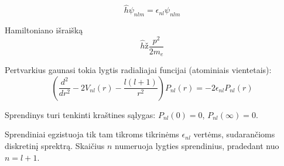 \begin{equation*}
    \hat{h} \psi_{nlm} = \epsilon_{nl} \psi_{nlm}
\end{equation*}

Hamiltoniano išraišką
\begin{equation*}
    \hat{h} ž \frac{p^2}{2m_e}
\end{equation*}



Pertvarkius gaunasi tokia lygtis radialiajai funcijai (atominiais vientetais):
\begin{equation*}
    \left( \frac{d^2}{dr^2} - 2 V_{nl}(r) - \frac{l (l+1)}{r^2} \right) P_{nl}(r) = -2 \epsilon_{nl} P_{nl}(r)
\end{equation*}

Sprendinys turi tenkinti kraštines sąlygas: $P_{nl} (0) = 0$, $P_{nl}(\infty) = 0$.

Sprendiniai egzistuoja tik tam tikroms tikrinėms $\epsilon_{nl}$ vertėms, sudarančioms diskretinį sprektrą. Skaičius $n$ numeruoja lygties sprendinius, pradedant nuo $n=l+1$.



